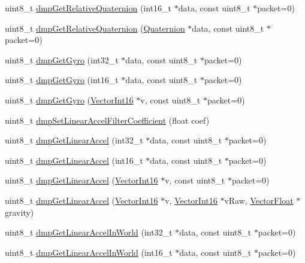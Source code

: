 \begin{DoxyCompactItemize}
\item 
uint8\+\_\+t \mbox{\hyperlink{classMPU6050_ac74ebf94e4504dfe258d8c739d63d807}{dmp\+Get\+Relative\+Quaternion}} (int16\+\_\+t $\ast$data, const uint8\+\_\+t $\ast$packet=0)
\item 
uint8\+\_\+t \mbox{\hyperlink{classMPU6050_ad1b10602a76de6a84365ff2c3e3ee69d}{dmp\+Get\+Relative\+Quaternion}} (\mbox{\hyperlink{classQuaternion}{Quaternion}} $\ast$data, const uint8\+\_\+t $\ast$packet=0)
\item 
uint8\+\_\+t \mbox{\hyperlink{classMPU6050_a6625cf6f1ceb2e9c2503a590ade6686b}{dmp\+Get\+Gyro}} (int32\+\_\+t $\ast$data, const uint8\+\_\+t $\ast$packet=0)
\item 
uint8\+\_\+t \mbox{\hyperlink{classMPU6050_a8cb79f053e00eb70b898be131b467748}{dmp\+Get\+Gyro}} (int16\+\_\+t $\ast$data, const uint8\+\_\+t $\ast$packet=0)
\item 
uint8\+\_\+t \mbox{\hyperlink{classMPU6050_a97d9c59f863800ea8d804013d860ba08}{dmp\+Get\+Gyro}} (\mbox{\hyperlink{classVectorInt16}{Vector\+Int16}} $\ast$v, const uint8\+\_\+t $\ast$packet=0)
\item 
uint8\+\_\+t \mbox{\hyperlink{classMPU6050_a7142bff552ab1e980cba38f97772eecd}{dmp\+Set\+Linear\+Accel\+Filter\+Coefficient}} (float coef)
\item 
uint8\+\_\+t \mbox{\hyperlink{classMPU6050_aa36d05bce800803489ae4da91f63ed2d}{dmp\+Get\+Linear\+Accel}} (int32\+\_\+t $\ast$data, const uint8\+\_\+t $\ast$packet=0)
\item 
uint8\+\_\+t \mbox{\hyperlink{classMPU6050_ac3a746d1a5c2d9973f2315bd998fb102}{dmp\+Get\+Linear\+Accel}} (int16\+\_\+t $\ast$data, const uint8\+\_\+t $\ast$packet=0)
\item 
uint8\+\_\+t \mbox{\hyperlink{classMPU6050_a72cfa08b409ce18689f19b81bd285780}{dmp\+Get\+Linear\+Accel}} (\mbox{\hyperlink{classVectorInt16}{Vector\+Int16}} $\ast$v, const uint8\+\_\+t $\ast$packet=0)
\item 
uint8\+\_\+t \mbox{\hyperlink{classMPU6050_aa58cddb02075ed4e7ae0afa51cfdce7d}{dmp\+Get\+Linear\+Accel}} (\mbox{\hyperlink{classVectorInt16}{Vector\+Int16}} $\ast$v, \mbox{\hyperlink{classVectorInt16}{Vector\+Int16}} $\ast$v\+Raw, \mbox{\hyperlink{classVectorFloat}{Vector\+Float}} $\ast$gravity)
\item 
uint8\+\_\+t \mbox{\hyperlink{classMPU6050_a1c63096808722eafb96e88e41a4af115}{dmp\+Get\+Linear\+Accel\+In\+World}} (int32\+\_\+t $\ast$data, const uint8\+\_\+t $\ast$packet=0)
\item 
uint8\+\_\+t \mbox{\hyperlink{classMPU6050_a097673d9ae96274ab711aaef7827411d}{dmp\+Get\+Linear\+Accel\+In\+World}} (int16\+\_\+t $\ast$data, const uint8\+\_\+t $\ast$packet=0)

\end{DoxyCompactItemize}
